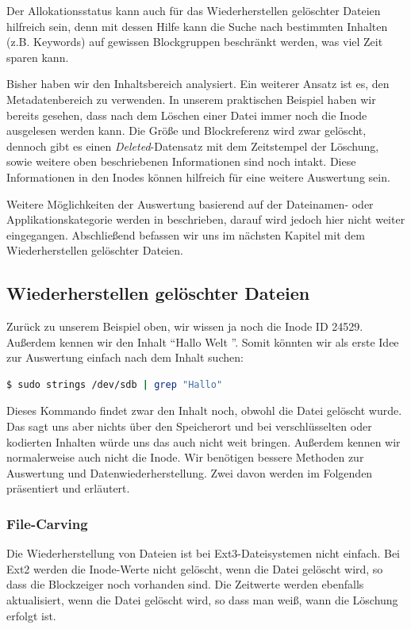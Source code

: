 Der Allokationsstatus kann auch für das Wiederherstellen gelöschter Dateien hilfreich sein, denn mit dessen Hilfe kann die Suche nach bestimmten Inhalten (z.B. Keywords) auf gewissen Blockgruppen beschränkt werden, was viel Zeit sparen kann. 

Bisher haben wir den Inhaltsbereich analysiert. Ein weiterer Ansatz ist es, den Metadatenbereich zu verwenden. In unserem praktischen Beispiel haben wir bereits gesehen, dass nach dem Löschen einer Datei immer noch die Inode ausgelesen werden kann. Die Größe und Blockreferenz wird zwar gelöscht, dennoch gibt es einen \textit{Deleted}-Datensatz mit dem Zeitstempel der Löschung, sowie weitere oben beschriebenen Informationen sind noch intakt. Diese Informationen in den Inodes können hilfreich für eine weitere Auswertung sein.

Weitere Möglichkeiten der Auswertung basierend auf der Dateinamen- oder Applikationskategorie werden in \cite{Carrier.06.01.2022} beschrieben, darauf wird jedoch hier nicht weiter eingegangen. Abschließend befassen wir uns im nächsten Kapitel mit dem Wiederherstellen gelöschter Dateien. 

\subsection{Wiederherstellen gelöschter Dateien}

Zurück zu unserem Beispiel oben, wir wissen ja noch die Inode ID 24529. Außerdem kennen wir den Inhalt "`Hallo Welt "'. Somit könnten wir als erste Idee zur Auswertung einfach nach dem Inhalt suchen:

\begin{lstlisting}[language=bash]
$ sudo strings /dev/sdb | grep "Hallo"
\end{lstlisting}
 
Dieses Kommando findet zwar den Inhalt noch, obwohl die Datei gelöscht wurde. Das sagt uns aber nichts über den Speicherort  und bei verschlüsselten oder kodierten Inhalten würde uns das auch nicht weit bringen. Außerdem kennen wir normalerweise auch nicht die Inode. Wir benötigen bessere Methoden zur Auswertung und Datenwiederherstellung. Zwei davon werden im Folgenden präsentiert und erläutert.

\subsubsection{File-Carving}

Die Wiederherstellung von Dateien ist bei Ext3-Dateisystemen nicht einfach. Bei Ext2 werden die Inode-Werte nicht gelöscht, wenn die Datei gelöscht wird, so dass die Blockzeiger noch vorhanden sind. Die Zeitwerte werden ebenfalls aktualisiert, wenn die Datei gelöscht wird, so dass man weiß, wann die Löschung erfolgt ist.

